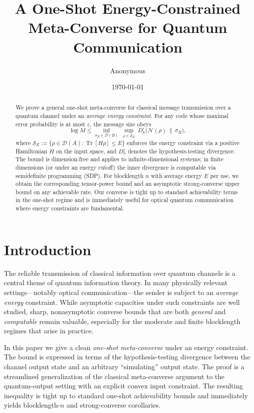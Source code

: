 \documentclass[11pt]{article}
\title{A One-Shot Energy-Constrained Meta-Converse for Quantum Communication}
\author{Anonymous}
\date{\today}
\theoremstyle{definition}
\DeclareMathOperator{\Tr}{Tr}
\newcommand{\Dheps}[1]{D_h^{#1}}
\newcommand{\calN}{\mathcal{N}}
\newcommand{\calD}{\mathcal{D}}
\newcommand{\calS}{\mathcal{S}}
\begin{document}
\maketitle

\begin{abstract}
We prove a general one-shot meta-converse for classical message transmission over a quantum channel under an \emph{average energy constraint}. For any code whose maximal error probability is at most $\varepsilon$, the message size obeys
\[
\log M \le \inf_{\sigma_B \in \calD(B)} \ \sup_{\rho \in \calS_E} \ \Dheps{\varepsilon}\!\big(\calN(\rho)\,\big\|\,\sigma_B\big),
\]
where $\calS_E := \{\rho\in\calD(A): \Tr[H\rho] \le E\}$ enforces the energy constraint via a positive Hamiltonian $H$ on the input space, and $\Dheps{\varepsilon}$ denotes the hypothesis-testing divergence. The bound is dimension-free and applies to infinite-dimensional systems; in finite dimensions (or under an energy cutoff) the inner divergence is computable via semidefinite programming (SDP). For blocklength $n$ with average energy $E$ per use, we obtain the corresponding tensor-power bound and an asymptotic strong-converse upper bound on any achievable rate. Our converse is tight up to standard achievability terms in the one-shot regime and is immediately useful for optical quantum communication where energy constraints are fundamental.
\end{abstract}

\section{Introduction}
The reliable transmission of classical information over quantum channels is a central theme of quantum information theory.
In many physically relevant settings---notably optical communication---the sender is subject to an \emph{average energy} constraint.
While asymptotic capacities under such constraints are well studied, sharp, nonasymptotic converse bounds that are both \emph{general} and \emph{computable} remain valuable, especially for the moderate and finite blocklength regimes that arise in practice.

In this paper we give a clean \emph{one-shot meta-converse} under an energy constraint. The bound is expressed in terms of the hypothesis-testing divergence between the channel output state and an arbitrary ``simulating'' output state. The proof is a streamlined generalization of the classical meta-converse argument to the quantum-output setting with an explicit convex input constraint. The resulting inequality is tight up to standard one-shot achievability bounds and immediately yields blocklength-$n$ and strong-converse corollaries.
\end{document}
